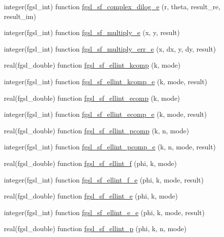 \begin{DoxyCompactItemize}
integer(fgsl\+\_\+int) function \hyperlink{specfunc_8finc_a22e46d53082bc5cd7b95310ab4015de3}{fgsl\+\_\+sf\+\_\+complex\+\_\+dilog\+\_\+e} (r, theta, result\+\_\+re, result\+\_\+im)
\item 
integer(fgsl\+\_\+int) function \hyperlink{specfunc_8finc_a88051ba6dc239deaf189aa04bec6c760}{fgsl\+\_\+sf\+\_\+multiply\+\_\+e} (x, y, result)
\item 
integer(fgsl\+\_\+int) function \hyperlink{specfunc_8finc_aa3906e99af0b3d5ebb5c7132916e564f}{fgsl\+\_\+sf\+\_\+multiply\+\_\+err\+\_\+e} (x, dx, y, dy, result)
\item 
real(fgsl\+\_\+double) function \hyperlink{specfunc_8finc_a0fd9b9da6309c4124ac958c8dc07985d}{fgsl\+\_\+sf\+\_\+ellint\+\_\+kcomp} (k, mode)
\item 
integer(fgsl\+\_\+int) function \hyperlink{specfunc_8finc_a35bddb22f495db07473338a26554b2ee}{fgsl\+\_\+sf\+\_\+ellint\+\_\+kcomp\+\_\+e} (k, mode, result)
\item 
real(fgsl\+\_\+double) function \hyperlink{specfunc_8finc_ab7b235eeba115f0001b16727b60956f0}{fgsl\+\_\+sf\+\_\+ellint\+\_\+ecomp} (k, mode)
\item 
integer(fgsl\+\_\+int) function \hyperlink{specfunc_8finc_a94f1b4905d619abdcc0f096bbbbb3cd7}{fgsl\+\_\+sf\+\_\+ellint\+\_\+ecomp\+\_\+e} (k, mode, result)
\item 
real(fgsl\+\_\+double) function \hyperlink{specfunc_8finc_a55ce744a4ed005e9a3d61ac70ce54650}{fgsl\+\_\+sf\+\_\+ellint\+\_\+pcomp} (k, n, mode)
\item 
integer(fgsl\+\_\+int) function \hyperlink{specfunc_8finc_a5f126c30a9ef61fcb6a5e1c01cf56cb5}{fgsl\+\_\+sf\+\_\+ellint\+\_\+pcomp\+\_\+e} (k, n, mode, result)
\item 
real(fgsl\+\_\+double) function \hyperlink{specfunc_8finc_a792cb2852a913e6f3fd37c58b7907ee2}{fgsl\+\_\+sf\+\_\+ellint\+\_\+f} (phi, k, mode)
\item 
integer(fgsl\+\_\+int) function \hyperlink{specfunc_8finc_af79d3fb7872a2c40ee25553c4c209a23}{fgsl\+\_\+sf\+\_\+ellint\+\_\+f\+\_\+e} (phi, k, mode, result)
\item 
real(fgsl\+\_\+double) function \hyperlink{specfunc_8finc_a286872eeaa9701d0de36ee03a1e9ecff}{fgsl\+\_\+sf\+\_\+ellint\+\_\+e} (phi, k, mode)
\item 
integer(fgsl\+\_\+int) function \hyperlink{specfunc_8finc_a7546a3ed0428be3886c947823fbb54d5}{fgsl\+\_\+sf\+\_\+ellint\+\_\+e\+\_\+e} (phi, k, mode, result)
\item 
real(fgsl\+\_\+double) function \hyperlink{specfunc_8finc_ac0e8d59bbbbf84452cdefb65cf1dc38c}{fgsl\+\_\+sf\+\_\+ellint\+\_\+p} (phi, k, n, mode)

\end{DoxyCompactItemize}
